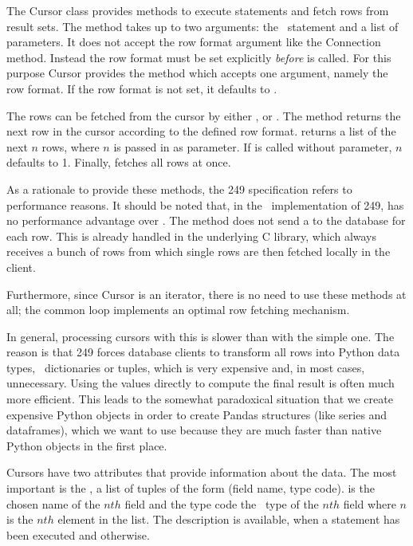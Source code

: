 The Cursor class provides methods to
execute statements and fetch rows from result sets.
The  method takes up to two arguments:
the \sql\ statement and a list of parameters.
It does not accept the row format argument like
the Connection method. Instead the row format
must be set explicitly \emph{before} 
is called. For this purpose Cursor provides the
method  which accepts one argument,
namely the row format. If the row format is not set,
it defaults to .

The rows can be fetched from the cursor by either
,
 or
.
The method  returns the next row
in the cursor according to the defined row format.
 returns a list of the next $n$ rows,
where $n$ is passed in as parameter. If 
is called without parameter, $n$ defaults to 1.
Finally,  fetches all rows at once.

As a rationale to provide these methods,
the  249 specification refers
to performance reasons. It should be noted
that, in the \nowdb\ implementation of
 249,  has no performance
advantage over .
The method does not send a 
to the database for each row.
This is already handled in the underlying
C library, which always receives a bunch of rows
from which single rows are then fetched locally
in the client.

Furthermore, since Cursor is an iterator,
there is no need to use these methods at all;
the common  loop implements an optimal
row fetching mechanism.

In general, processing cursors with this 
is slower than with the simple one.
The reason is that  249 forces
database clients to transform all rows into Python
data types, \viz\ dictionaries or tuples,
which is very expensive and, in most cases,
unnecessary.
Using the values directly to compute the final result
is often much more efficient.
This leads to the somewhat paradoxical situation
that we create expensive Python objects
in order to create Pandas structures (like series and
dataframes), which we want to use because they
are much faster than native Python objects in the first place.

Cursors have two attributes that provide information
about the data. The most important is the ,
a list of tuples of the form (field name, type code).
 is the chosen name of the $nth$ field
and the type code the \nowdb\ type of the $nth$ field where
$n$ is the $nth$ element in the list.
The description is available, when a  statement
has been executed and  otherwise.

